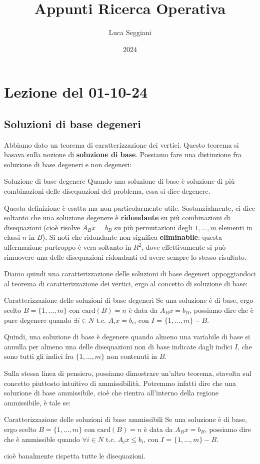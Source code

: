 \documentclass[a4paper,11pt]{article}
\title{Appunti Ricerca Operativa}
\author{Luca Seggiani}
\date{2024}
\begin{document}
\section{Lezione del 01-10-24}

\thispagestyle{empty}
\pagestyle{fancy}

\subsection{Soluzioni di base degeneri}
Abbiamo dato un teorema di caratterizzazione dei vertici.
Questo teorema si basava sulla nozione di \textbf{soluzione di base}.
Possiamo fare una distinzione fra soluzione di base degeneri e non degeneri:
\begin{definition}{Soluzione di base degenere}
Quando una soluzione di base è soluzione di più combinazioni delle disequazioni del problema, essa si dice degenere.
\end{definition}

Questa definizione è esatta ma non particolarmente utile.
Sostanzialmente, ci dice soltanto che una soluzione degenere è \textbf{ridondante} su più combinazioni di disequazioni (cioè risolve $A_Bx = b_B$ su più permutazioni degli $1,...,m$ elementi in classi $n$ in $B$).
Si noti che ridondante non significa \textbf{eliminabile}: questa affermazione purtroppo è vera soltanto in $R^2$, dove effettivamente si può rimuovere una delle disequazioni ridondanti ed avere sempre lo stesso risultato.

Diamo quindi una caratterizzazione delle soluzioni di base degeneri appoggiandoci al teorema di caratterizzazione dei vertici, ergo al concetto di soluzione di base:
\begin{theorem}{Caratterizzazione delle soluzioni di base degeneri}
	Se una soluzione è di base, ergo scelto $B = \{ 1, ..., m \}$ con $\mathrm{card}(B) = n$ è data da $A_Bx = b_B$, possiamo dire che è pure degenere quando $\exists i \in N$ t.c. $A_i x = b_i$, con $I$ = $\{1, ..., m\} - B$. 
\end{theorem}
Quindi, una soluzione di base è degenere quando almeno una variabile di base si annulla per almeno una delle disequazioni non di base indicate dagli indici $I$, che sono tutti gli indici fra $\{1,...,m\}$ non contenuti in $B$. 

Sulla stessa linea di pensiero, possiamo dimostrare un'altro teorema, stavolta sul concetto piuttosto intuitivo di ammissibilità.
Potremmo infatti dire che una soluzione di base ammissibile, cioè che rientra all'interno della regione ammissibile, è tale se:
\begin{theorem}{Caratterizzazione delle soluzioni di base ammissibili}
	Se una soluzione è di base, ergo scelto $B = \{ 1, ..., m \}$ con $\mathrm{card}(B) = n$ è data da $A_Bx = b_B$, possiamo dire che è ammissible quando $\forall i \in N$ t.c. $A_i x \leq b_i$, con $I$ = $\{1, ..., m\} - B$. 
\end{theorem}
cioè banalmente rispetta tutte le disequazioni.
\end{document}
